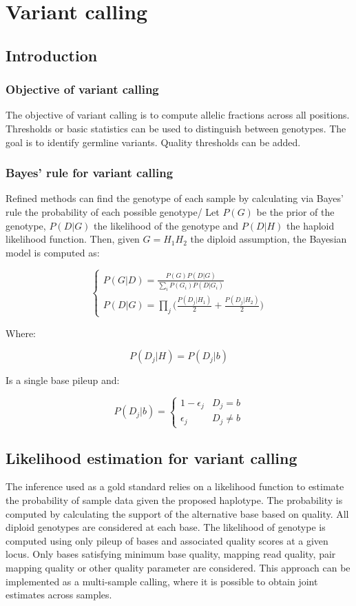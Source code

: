 \graphicspath{{chapters/laboratory/03/images/}}
\chapter{Variant calling}

\section{Introduction}

	\subsection{Objective of variant calling}
	The objective of variant calling is to compute allelic fractions across all positions.
	Thresholds or basic statistics can be used to distinguish between genotypes.
	The goal is to identify germline variants.
	Quality thresholds can be added.

	\subsection{Bayes' rule for variant calling}
	Refined methods can find the genotype of each sample by calculating via Bayes' rule the probability of each possible genotype/
	Let $P(G)$ be the prior of the genotype, $P(D|G)$ the likelihood of the genotype and $P(D|H)$ the haploid likelihood function.
	Then, given $G = H_1H_2$ the diploid assumption, the Bayesian model is computed as:

	$$\begin{cases}P(G|D) = \frac{P(G)P(D|G)}{\sum\limits_iP(G_i)P(D|G_i)}\\P(D|G) = \prod\limits_j\big(\frac{P(D_j|H_1)}{2} + \frac{P(D_j|H_2)}{2}\big)\end{cases}$$

	Where:

	$$P(D_j|H) = P(D_j|b)$$

	Is a single base pileup and:

	$$P(D_j|b) = \begin{cases}1-\epsilon_j & D_j = b\\\epsilon_j & D_j\neq b\end{cases}$$


\section{Likelihood estimation for variant calling}
The inference used as a gold standard relies on a likelihood function to estimate the probability of sample data given the proposed haplotype.
The probability is computed by calculating the support of the alternative base based on quality.
All diploid genotypes are considered at each base.
The likelihood of genotype is computed using only pileup of bases and associated quality scores at a given locus.
Only bases satisfying minimum base quality, mapping read quality, pair mapping quality or other quality parameter are considered.
This approach can be implemented as a multi-sample calling, where it is possible to obtain joint estimates across samples.

